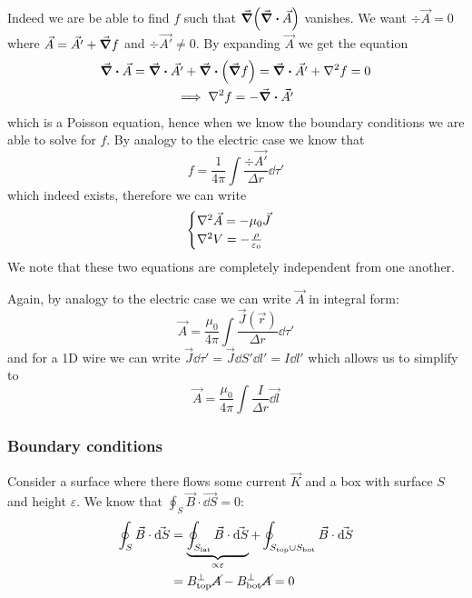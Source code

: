\documentclass[12pt]{extarticle}
\begin{document}
Indeed we are be able to find $f$ such that $\grad(\div \vec A)$ vanishes.
We want $\div \vec A = 0$ where $\vec A = \vec{A'} + \grad f$ and $\div \vec{A'} \neq 0$.
By expanding $\vec A$ we get the equation
\begin{gather}
    \div \vec A = \div \vec{A '} + \div(\grad f) = \div \vec{A '} + \laplacian f = 0 \\
    \implies \laplacian f = - \div \vec{A '}
\end{gather}
which is a Poisson equation, hence when we know the boundary conditions we are able to solve for $f$.
By analogy to the electric case we know that
\begin{equation}
    f = \frac{1}{4 \pi} \int \frac{\div \vec{A '}}{\Delta r} \dd \tau '
\end{equation}
which indeed exists, therefore we can write
\begin{equation}
    \begin{cases}
        \laplacian \vec A = - \mu_0 \vec J \\
        \laplacian V = - \frac{\rho}{\varepsilon_0}
    \end{cases}
\end{equation}
We note that these two equations are completely independent from one another.

Again, by analogy to the electric case we can write $\vec A$ in integral form:
\begin{equation}
    \vec A = \frac{\mu_0}{4 \pi} \int \frac{\vec J(\vec r)}{\Delta r} \dd \tau '
\end{equation}
and for a 1D wire we can write $\vec J \dd \tau' = \vec J \dd S' \dd l ' = I \dd l'$
which allows us to simplify to
\begin{equation}
    \vec A = \frac{\mu_0}{4 \pi}\int \frac{I}{\Delta r} \vec{\dd l}
\end{equation}

\subsubsection{Boundary conditions}

Consider a surface where there flows some current $\vec K$ and a box with surface $S$ and height $\varepsilon$.
We know that $\oint_S \vec B \cdot \vec{\dd S} = 0$:
\begin{align}
    \oint_S \vec B \cdot \vec{\dd S}
     & = \underbrace{\oint_{S_\text{lat}} \vec B \cdot \vec{\dd S}}_{\propto \varepsilon} +\oint_{S_\text{top} \cup S_\text{bot}}\vec B \cdot \vec{\dd S} \\
     & = B_\text{top}^{\perp} \cancel{A} - B_\text{bot}^{\perp} \cancel{A} = 0
\end{align}
\end{document}
